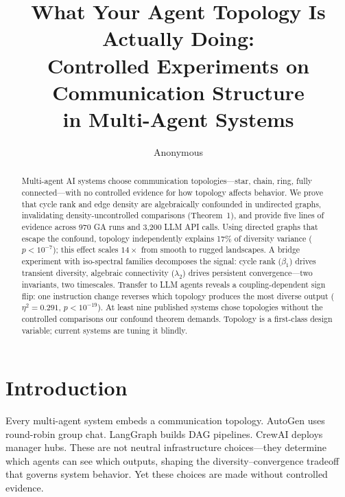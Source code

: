 \documentclass[runningheads]{llncs}
\begin{document}
\title{What Your Agent Topology Is Actually Doing:\\
Controlled Experiments on Communication Structure\\
in Multi-Agent Systems}


\author{Anonymous}

\maketitle

\begin{abstract}
Multi-agent AI systems choose communication topologies---star, chain,
ring, fully connected---with no controlled evidence for how topology
affects behavior. We prove that cycle rank and edge density are
algebraically confounded in undirected graphs, invalidating
density-uncontrolled comparisons (Theorem~1), and provide five lines
of evidence across 970 GA runs and 3,200 LLM API calls. Using
directed graphs that escape the confound, topology independently
explains 17\% of diversity variance ($p < 10^{-7}$); this effect
scales $14\times$ from smooth to rugged landscapes. A bridge
experiment with iso-spectral families decomposes the signal: cycle
rank ($\beta_1$) drives transient diversity, algebraic connectivity
($\lambda_2$) drives persistent convergence---two invariants, two
timescales. Transfer to LLM agents reveals a coupling-dependent sign
flip: one instruction change reverses which topology produces the
most diverse output ($\eta^2 = 0.291$, $p < 10^{-19}$). At least
nine published systems chose topologies without the controlled
comparisons our confound theorem demands. Topology is a first-class
design variable; current systems are tuning it blindly.
\end{abstract}

\section{Introduction}
\label{sec:intro}

Every multi-agent system embeds a communication topology. AutoGen uses
round-robin group chat. LangGraph builds DAG pipelines. CrewAI deploys
manager hubs. These are not neutral infrastructure choices---they
determine which agents can see which outputs, shaping the
diversity--convergence tradeoff that governs system behavior. Yet
these choices are made without controlled evidence.
\end{document}
